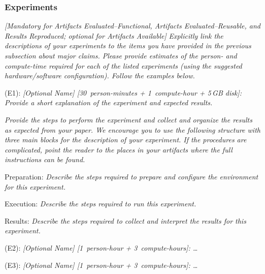 
\subsubsection{Experiments}

\emph{[Mandatory for \emph{Artifacts Evaluated--Functional},
  \emph{Artifacts Evaluated--Reusable}, and \emph{Results Reproduced};
  optional for \emph{Artifacts Available}]}
%
\emph{Explicitly link the descriptions of your experiments to the
items you have provided in the previous subsection about major claims.
Please provide estimates of the person- and compute-time required for
each of the listed experiments (using the suggested hardware/software
configuration).  Follow the examples below.}

\bigskip
\begin{compactitem}
\item[(E1):]
  \emph{[Optional Name] [30~person-minutes + 1~compute-hour + 5\,GB
    disk]: Provide a short explanation of the experiment and expected
  results.}

  \emph{Provide the steps to perform the experiment and collect and
  organize the results as expected from your paper.  We encourage you
  to use the following structure with three main blocks for the
  description of your experiment.  If the procedures are complicated,
  point the reader to the places in your artifacts where the full
  instructions can be found.}

  \begin{asparadesc}
  \item[Preparation:] \emph{Describe the steps required to prepare and
  configure the environment for this experiment.}

  \item[Execution:] \emph{Describe the steps required to run this
  experiment.}

  \item[Results:] \emph{Describe the steps required to collect and
  interpret the results for this experiment.}
  \end{asparadesc}

\item[(E2):] \emph{[Optional Name] [1~person-hour + 3~compute-hours]: \ldots}

\item[(E3):] \emph{[Optional Name] [1~person-hour + 3~compute-hours]: \ldots}
\end{compactitem}
\bigskip

